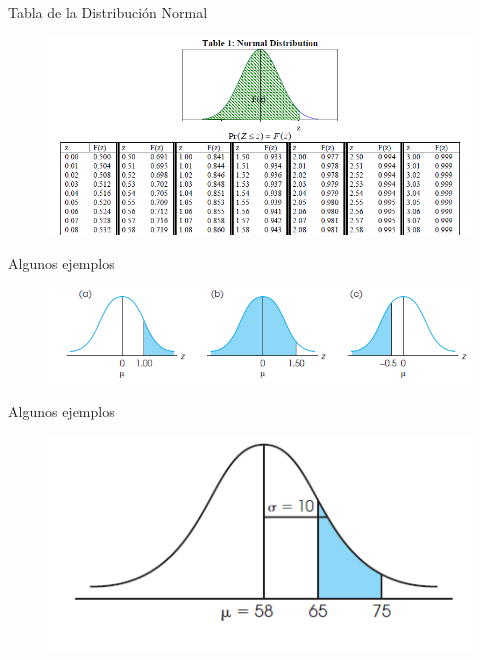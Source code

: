 \documentclass[xcolor=dvipsnames]{beamer}
\begin{document}
\begin{frame}{Tabla de la Distribución Normal}
	\begin{figure}[H]  
		\includegraphics[width = 1\textwidth]{./cap3}
	\end{figure}
\end{frame}

\begin{frame}{Algunos ejemplos}
	\begin{figure}[H]
		\centering  
		\caption{ } 
		\includegraphics[width = 1\textwidth]{./cap1}
	\end{figure}
\end{frame}

\begin{frame}{Algunos ejemplos}
	\begin{figure}[H]
		\centering  
		\caption{ } 
		\includegraphics[width = 1\textwidth]{./cap2}
	\end{figure}
\end{frame}
\end{document}
